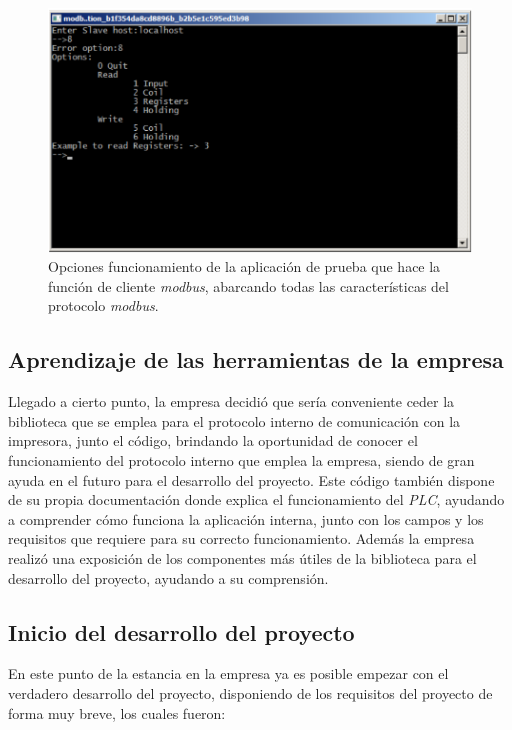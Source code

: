 \documentclass[pdftex,11pt,a4paper]{book}
\begin{document}
\begin{figure}[h]
\begin{center}
\includegraphics[width=\textwidth]{img/cliente_modbus.png}
\caption{\label{cliente_mod}Opciones funcionamiento de la aplicación de prueba que hace la función de cliente \emph{modbus}, abarcando todas las características del protocolo \emph{modbus}.}
\end{center}
\end{figure}

\subsection{Aprendizaje de las herramientas de la empresa}

Llegado a cierto punto, la empresa decidió que sería conveniente ceder la biblioteca que se emplea para el protocolo interno de comunicación con la impresora, junto el código,
brindando la oportunidad de conocer el funcionamiento del protocolo interno que emplea la empresa, siendo de gran ayuda en el futuro para el desarrollo del proyecto. Este código también dispone de su propia documentación donde explica el funcionamiento del \emph{PLC}, ayudando a comprender cómo funciona la aplicación interna, junto con los campos y los requisitos que requiere para su correcto funcionamiento. Además la empresa realizó una exposición de los componentes más útiles de la biblioteca para el desarrollo del proyecto, ayudando a su comprensión.

\subsection{Inicio del desarrollo del proyecto}

En este punto de la estancia en la empresa ya es posible empezar con el verdadero desarrollo del proyecto, disponiendo de los requisitos del proyecto de forma muy breve, los cuales fueron:
\end{document}
